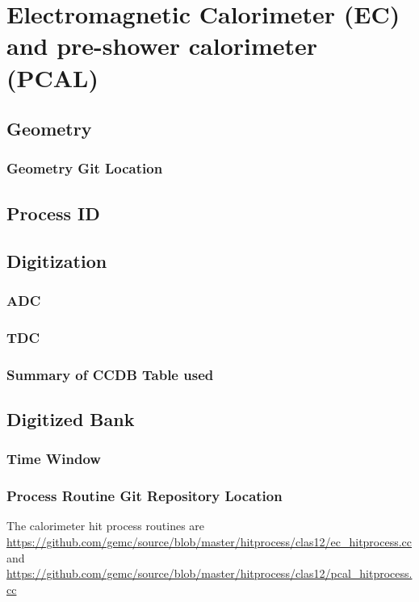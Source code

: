\section{Electromagnetic Calorimeter (EC) and pre-shower calorimeter (PCAL)}

\subsection{Geometry}

\subsubsection{Geometry Git Location}

\subsection{Process ID}

\subsection{Digitization}


\subsubsection{ADC}
\subsubsection{TDC}

\subsubsection{Summary of CCDB Table used}

\subsection{Digitized Bank}

\subsubsection{Time Window}

\subsubsection{Process Routine Git Repository Location}

The calorimeter hit process routines are \url{https://github.com/gemc/source/blob/master/hitprocess/clas12/ec_hitprocess.cc} and
\url{https://github.com/gemc/source/blob/master/hitprocess/clas12/pcal_hitprocess.cc}

